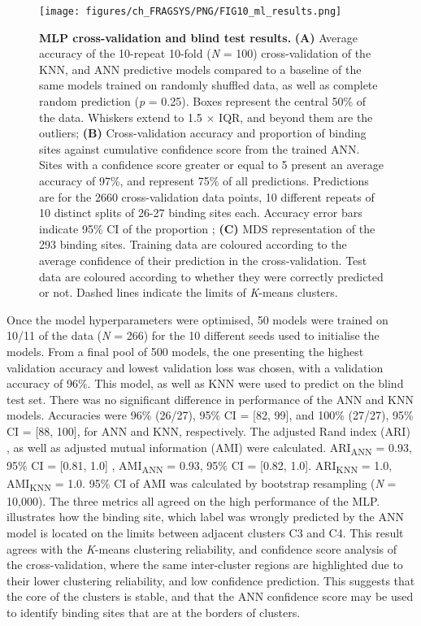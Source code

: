 \begin{figure}[htb!]
    \centering
    \texttt{[image: figures/ch\_FRAGSYS/PNG/FIG10\_ml\_results.png]}
    \caption[MLP cross-validation and blind test results]{\textbf{MLP cross-validation and blind test results.} \textbf{(A)} Average accuracy of the 10-repeat 10-fold (\textit{N} = 100) cross-validation of the KNN, and ANN predictive models compared to a baseline of the same models trained on randomly shuffled data, as well as complete random prediction (\textit{p} = 0.25). Boxes represent the central 50\% of the data. Whiskers extend to 1.5 $\times$ IQR, and beyond them are the outliers; \textbf{(B)} Cross-validation accuracy and proportion of binding sites against cumulative confidence score from the trained ANN. Sites with a confidence score greater or equal to 5 present an average accuracy of 97\%, and represent 75\% of all predictions. Predictions are for the 2660 cross-validation data points, 10 different repeats of 10 distinct splits of 26-27 binding sites each. Accuracy error bars indicate 95\% CI of the proportion \cite{WILSON_197_PROP_CI}; \textbf{(C)} MDS representation of the 293 binding sites. Training data are coloured according to the average confidence of their prediction in the cross-validation. Test data are coloured according to whether they were correctly predicted or not. Dashed lines indicate the limits of \textit{K}-means clusters.}
    \label{fig:MLP_CV_blind_test}
\end{figure}

Once the model hyperparameters were optimised, 50 models were trained on 10/11 of the data (\textit{N} = 266) for the 10 different seeds used to initialise the models. From a final pool of 500 models, the one presenting the highest validation accuracy and lowest validation loss was chosen, with a validation accuracy of 96\%. This model, as well as KNN were used to predict on the blind test set. There was no significant difference in performance of the ANN and KNN models. Accuracies were 96\% (26/27), 95\% CI = [82, 99], and 100\% (27/27), 95\% CI = [88, 100], for ANN and KNN, respectively. The adjusted Rand index (ARI) \cite{RAND_1971_ARI, HUBERT_1985_ARI}, as well as adjusted mutual information (AMI) \cite{VINH_2009_AMI, VINH_2010_AMI} were calculated. ARI\textsubscript{ANN} = 0.93, 95\% CI = [0.81, 1.0] \cite{STEINLEY_2016_ARI}, AMI\textsubscript{ANN} = 0.93, 95\% CI = [0.82, 1.0]. ARI\textsubscript{KNN} = 1.0, AMI\textsubscript{KNN} = 1.0. 95\% CI of AMI was calculated by bootstrap resampling (\textit{N} = 10,000). The three metrics all agreed on the high performance of the MLP.  illustrates how the binding site, which label was wrongly predicted by the ANN model is located on the limits between adjacent clusters C3 and C4. This result agrees with the \textit{K}-means clustering reliability, and confidence score analysis of the cross-validation, where the same inter-cluster regions are highlighted due to their lower clustering reliability, and low confidence prediction. This suggests that the core of the clusters is stable, and that the ANN confidence score may be used to identify binding sites that are at the borders of clusters.

